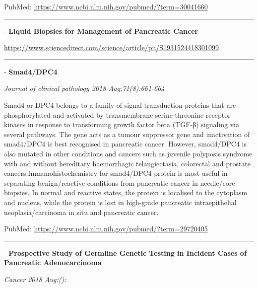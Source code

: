 \documentclass[]{article}
\begin{document}
PubMed: \url{https://www.ncbi.nlm.nih.gov/pubmed/?term=30041660}

{}

{}

\begin{center}\rule{0.5\linewidth}{\linethickness}\end{center}

 - \textbf{Liquid Biopsies for Management of Pancreatic Cancer}

\url{https://www.sciencedirect.com/science/article/pii/S1931524418301099}

\begin{center}\rule{0.5\linewidth}{\linethickness}\end{center}

 - \textbf{Smad4/DPC4}

\emph{Journal of clinical pathology 2018 Aug;71(8):661-664}

Smad4 or DPC4 belongs to a family of signal transduction proteins that
are phosphorylated and activated by transmembrane serine-threonine
receptor kinases in response to transforming growth factor beta (TGF-β)
signaling via several pathways. The gene acts as a tumour suppressor
gene and inactivation of smad4/DPC4 is best recognised in pancreatic
cancer. However, smad4/DPC4 is also mutated in other conditions and
cancers such as juvenile polyposis syndrome with and without hereditary
haemorrhagic telangiectasia, colorectal and prostate
cancers.Immunohistochemistry for smad4/DPC4 protein is most useful in
separating benign/reactive conditions from pancreatic cancer in
needle/core biopsies. In normal and reactive states, the protein is
localised to the cytoplasm and nucleus, while the protein is lost in
high-grade pancreatic intraepithelial neoplasia/carcinoma in situ and
pancreatic cancer.

PubMed: \url{https://www.ncbi.nlm.nih.gov/pubmed/?term=29720405}

{}

{}

\begin{center}\rule{0.5\linewidth}{\linethickness}\end{center}

 - \textbf{Prospective Study of Germline Genetic Testing in Incident
Cases of Pancreatic Adenocarcinoma}

\emph{Cancer 2018 Aug;():}
\end{document}
